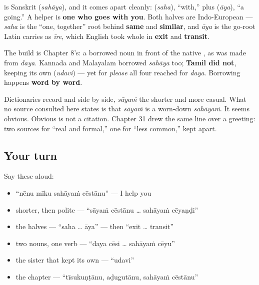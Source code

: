 \begin{cousinweb}
\textbf{} is Sanskrit \textbf{} (\emph{sahāya}), and it comes apart cleanly: \textbf{} (\emph{saha}), \textquotedblleft{}with,\textquotedblright{} plus \textbf{} (\emph{āya}), \textquotedblleft{}a going.\textquotedblright{} A helper is \textbf{one who goes with you}. Both halves are Indo-European — \emph{saha} is the \textquotedblleft{}one, together\textquotedblright{} root behind \textbf{same} and \textbf{similar}, and \emph{āya} is the go-root Latin carries as \emph{īre}, which English took whole in \textbf{exit} and \textbf{transit}.

The build is Chapter 8's: a borrowed noun in front of the native \textbf{}, as \textbf{} was made from \emph{daya}. Kannada and Malayalam borrowed \emph{sahāya} too; \textbf{Tamil did not}, keeping its own \textbf{} (\emph{udavi}) — yet for \emph{please} all four reached for \emph{daya}. Borrowing happens \textbf{word by word}.
\end{cousinweb}

\begin{culture}
Dictionaries record \textbf{} and \textbf{} side by side, \emph{sāyaṁ} the shorter and more casual. What no source consulted here states is that \emph{sāyaṁ} is a worn-down \emph{sahāyaṁ}. It seems obvious. Obvious is not a citation. Chapter 31 drew the same line over a greeting: two sources for \textquotedblleft{}real and formal,\textquotedblright{} one for \textquotedblleft{}less common,\textquotedblright{} kept apart.
\end{culture}

\subsection*{Your turn}
Say these aloud:

\begin{itemize}
\raggedright
  \item \textquotedblleft{}nēnu mīku sahāyaṁ cēstānu\textquotedblright{} — I help you
  \item shorter, then polite — \textquotedblleft{}sāyaṁ cēstānu … sahāyaṁ cēyaṇḍi\textquotedblright{}
  \item the halves — \textquotedblleft{}saha … āya\textquotedblright{} — then \textquotedblleft{}exit … transit\textquotedblright{}
  \item two nouns, one verb — \textquotedblleft{}daya cēsi … sahāyaṁ cēyu\textquotedblright{}
  \item the sister that kept its own — \textquotedblleft{}udavi\textquotedblright{}
  \item the chapter — \textquotedblleft{}tīsukuṇṭānu, aḍugutānu, sahāyaṁ cēstānu\textquotedblright{}
\end{itemize}

